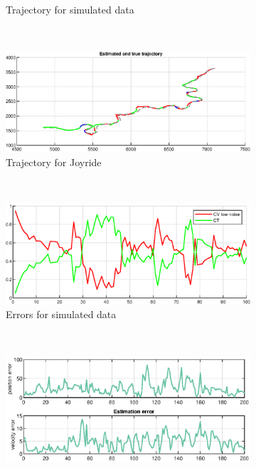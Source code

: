 \begin{figure}[ht]
\begin{subfigure}[b]{0.4\textwidth}
        \caption{Trajectory for simulated data}
        \label{fig:ga_1_2_estimated_trajectory}
    \end{subfigure}%
    ~
    \begin{subfigure}[b]{0.4\textwidth}
        \includegraphics[width=\textwidth]{figures/ga_1/joyride_estimated_trajectory}
        \caption{Trajectory for Joyride}
        \label{fig:ga_1_joyride_estimated_trajectory}
    \end{subfigure}
        \\
    \begin{subfigure}[b]{0.4\textwidth}
        \includegraphics[width=\textwidth]{figures/ga_1/2_error}
        \caption{Errors for simulated data}
        \label{fig:ga_1_2_error}
    \end{subfigure}%
    ~
    \begin{subfigure}[b]{0.4\textwidth}
        \includegraphics[width=\textwidth]{figures/ga_1/joyride_error}

\end{subfigure}
\end{figure}
